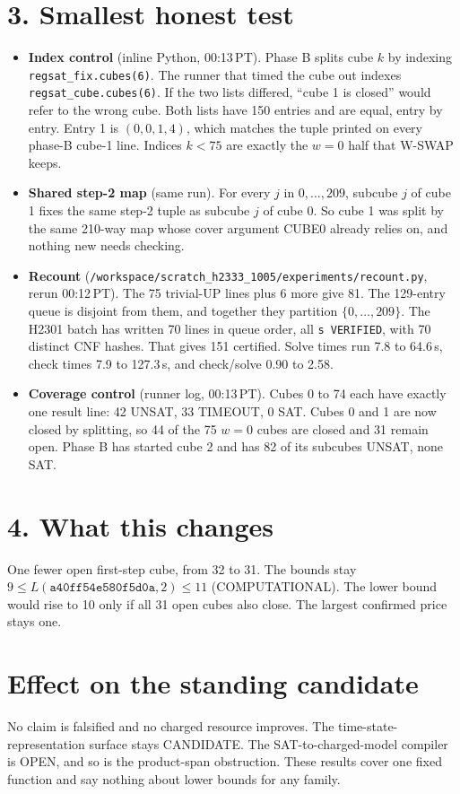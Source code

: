 \documentclass[11pt]{article}
\begin{document}
\section*{3. Smallest honest test}
\begin{itemize}
\item \textbf{Index control} (inline Python, 00:13\,PT). Phase B splits cube $k$ by indexing \texttt{regsat\_fix.cubes(6)}. The runner that timed the cube out indexes \texttt{regsat\_cube.cubes(6)}. If the two lists differed, ``cube 1 is closed'' would refer to the wrong cube. Both lists have 150 entries and are equal, entry by entry. Entry 1 is $(0,0,1,4)$, which matches the tuple printed on every phase-B cube-1 line. Indices $k<75$ are exactly the $w=0$ half that W-SWAP keeps.
\item \textbf{Shared step-2 map} (same run). For every $j$ in $0,\dots,209$, subcube $j$ of cube 1 fixes the same step-2 tuple as subcube $j$ of cube 0. So cube 1 was split by the same 210-way map whose cover argument CUBE0 already relies on, and nothing new needs checking.
\item \textbf{Recount} (\texttt{/workspace/scratch\_h2333\_1005/experiments/recount.py}, rerun 00:12\,PT). The 75 trivial-UP lines plus 6 more give 81. The 129-entry queue is disjoint from them, and together they partition $\{0,\dots,209\}$. The H2301 batch has written 70 lines in queue order, all \texttt{s VERIFIED}, with 70 distinct CNF hashes. That gives 151 certified. Solve times run 7.8 to 64.6\,s, check times 7.9 to 127.3\,s, and check/solve 0.90 to 2.58.
\item \textbf{Coverage control} (runner log, 00:13\,PT). Cubes 0 to 74 each have exactly one result line: 42 UNSAT, 33 TIMEOUT, 0 SAT. Cubes 0 and 1 are now closed by splitting, so 44 of the 75 $w=0$ cubes are closed and 31 remain open. Phase B has started cube 2 and has 82 of its subcubes UNSAT, none SAT.
\end{itemize}

\section*{4. What this changes}
One fewer open first-step cube, from 32 to 31. The bounds stay $9\le L(\texttt{a40ff54e580f5d0a},2)\le 11$ (COMPUTATIONAL). The lower bound would rise to 10 only if all 31 open cubes also close. The largest confirmed price stays one.

\section*{Effect on the standing candidate}
No claim is falsified and no charged resource improves. The time-state-representation surface stays CANDIDATE. The SAT-to-charged-model compiler is OPEN, and so is the product-span obstruction. These results cover one fixed function and say nothing about lower bounds for any family.
\end{document}
